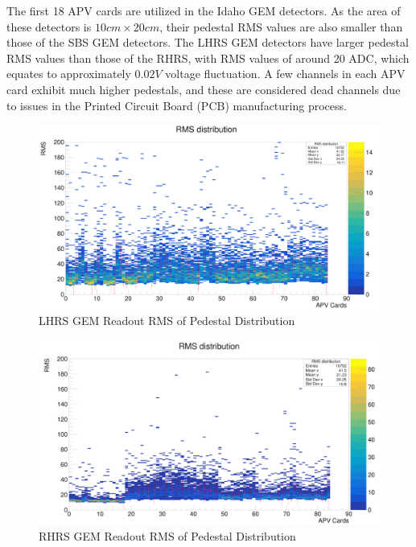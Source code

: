 The first 18 APV cards are utilized in the Idaho GEM detectors. As the area of these detectors is $10 cm \times 20 cm$, their pedestal RMS values are also smaller than those of the SBS GEM detectors. The LHRS GEM detectors have larger pedestal RMS values than those of the RHRS, with RMS values of around 20 ADC, which equates to approximately $0.02 V$ voltage fluctuation. A few channels in each APV card exhibit much higher pedestals, and these are considered dead channels due to issues in the Printed Circuit Board (PCB) manufacturing process.

\begin{figure}[!htbp]
    \centering
    \includegraphics[width=\textwidth]{images/chap5/LHRS_pedestal.png}
    \caption{LHRS GEM Readout RMS of Pedestal Distribution}
    \label{fig:lhrs_pedestal_distribution}
\end{figure}

\begin{figure}[!htbp]
    \centering
    \includegraphics[width=\textwidth]{images/chap5/rhrs_pedestal.png}
    \caption{RHRS GEM Readout RMS of Pedestal Distribution}
    \label{fig:rhrs_pedestal_distribution}
\end{figure}


